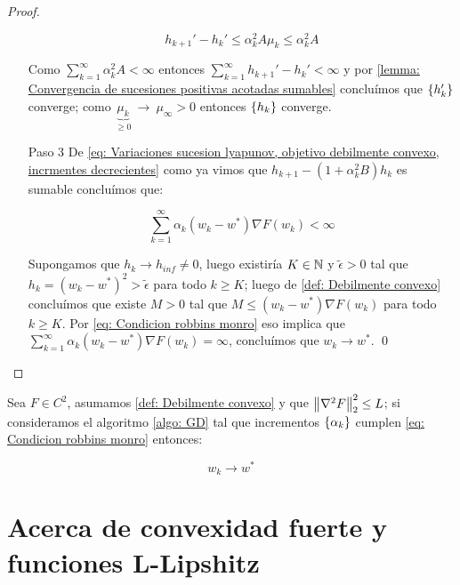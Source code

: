 \begin{proof}
\begin{enumerate}
		\begin{equation*}
			h_{k+1}' - h_{k}' \leq \alpha_k^2 A \mu_k \leq \alpha_k^2 A
		\end{equation*}
		
		Como $\sum\limits_{k=1}^{\infty} {\alpha_k^2 A} < \infty$ entonces $\sum\limits_{k=1}^{\infty}{h_{k+1}' - h_{k}'} < \infty$ y por \ref{lemma: Convergencia de sucesiones positivas acotadas sumables} conclu\'imos que $\left\lbrace h_k'\right\rbrace$ converge; como $\underbrace{\mu_k}_{\geq 0} \ \rightarrow \ \mu_{\infty} > 0$ entonces $\left\lbrace h_k\right\rbrace$ converge.
		
		\item[Paso 3] De \ref{eq: Variaciones sucesion lyapunov, objetivo debilmente convexo, incrmentes decrecientes} como ya vimos que $	h_{k+1} - \left(1 + \alpha_k^2 B\right)h_k$ es sumable conclu\'imos que:
		
		\begin{equation*}
			\sum\limits_{k=1}^{\infty} {\alpha_k \left(w_k - w^* \right)\nabla F(w_k)} < \infty
		\end{equation*}
		
		Supongamos que $h_k \rightarrow h_{inf} \neq 0$, luego existir\'ia $K\in {\mathbb{N}}$ y $\widetilde{\epsilon} >0$ tal que $h_k = \left(w_k - w^*\right)^2 > \widetilde{\epsilon}$ para todo $k \geq K$; luego de \ref{def: Debilmente convexo} conclu\'imos que existe $M > 0$ tal que $M \leq \left(w_k - w^* \right)\nabla F(w_k) $ para todo $k \geq K$. Por \ref{eq: Condicion robbins monro} eso implica que $\sum\limits_{k=1}^{\infty} {\alpha_k \left(w_k - w^* \right)\nabla F(w_k)} = \infty$, conclu\'imos que $w_k \rightarrow w^*$. \qed
		
	\end{enumerate}
	
\end{proof}

\begin{corollary}
	Sea $F \in C^2$, asumamos \ref{def: Debilmente convexo} y que $\left\lVert\nabla^2 F\right\rVert_2^2 \leq L$; si consideramos el algoritmo \ref{algo: GD} tal que incrementos $\left\lbrace\alpha_k\right\rbrace$  cumplen \ref{eq: Condicion robbins monro} entonces:
	
	\begin{equation}
	w_k \rightarrow w^*
	\end{equation}
\end{corollary}

\section{Acerca de convexidad fuerte y funciones L-Lipshitz}


